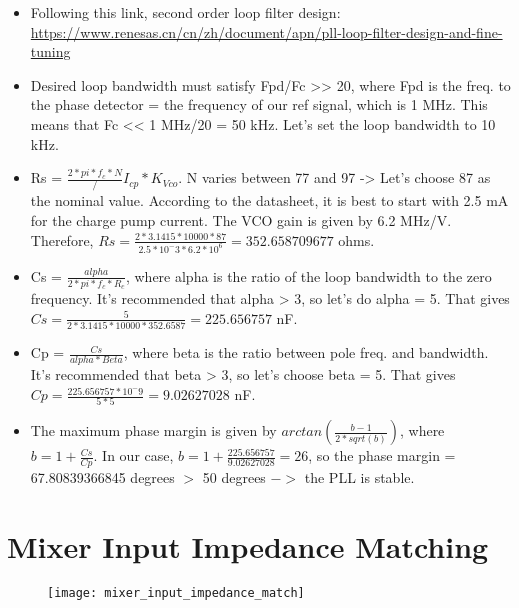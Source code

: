 \documentclass[12pt, letterpaper]{article}
\begin{document}
\begin{itemize}
    \item Following this link, second order loop filter design: \url{https://www.renesas.cn/cn/zh/document/apn/pll-loop-filter-design-and-fine-tuning}
    \item Desired loop bandwidth must satisfy Fpd/Fc >> 20, where Fpd is the freq. to the phase detector = the frequency of our ref signal, which is 1 MHz. This means that Fc << 1 MHz/20 = 50 kHz. Let's set the loop bandwidth to 10 kHz.
    \item Rs = \(\frac{2*pi*f_c*N}/{I_{cp}*K_{Vco}}\). N varies between 77 and 97 -> Let's choose 87 as the nominal value. According to the datasheet, it is best to start with 2.5 mA for the charge pump current. The VCO gain is given by 6.2 MHz/V. Therefore, \(Rs = \frac{2*3.1415*10000*87}{2.5*10^-3*6.2*10^6} = 352.658709677\) ohms. 
    \item Cs = \(\frac{alpha}{2*pi*f_c*R_c}\), where alpha is the ratio of the loop bandwidth to the zero frequency. It's recommended that alpha > 3, so let's do alpha = 5. That gives \(Cs = \frac{5}{2*3.1415*10000*352.6587} = 225.656757\) nF.
    \item Cp = \(\frac{Cs}{alpha*Beta}\), where beta is the ratio between pole freq. and bandwidth. It's recommended that beta > 3, so let's choose beta = 5. That gives \(Cp = \frac{225.656757*10^-9}{5*5} = 9.02627028\) nF.
    \item The maximum phase margin is given by \(arctan(\frac{b-1}{2*sqrt(b)})\), where \(b = 1 + \frac{Cs}{Cp}\). In our case, \(b = 1 + \frac{225.656757}{9.02627028} = 26\), so the phase margin = 67.80839366845 degrees \(>\) 50 degrees \(->\) the PLL is stable.
\end{itemize}

\section{Mixer Input Impedance Matching}

\begin{figure}[h]
    \texttt{[image: mixer\_input\_impedance\_match]}
\end{figure}
\end{document}
